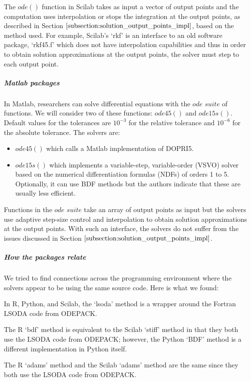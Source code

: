 The $ode()$ function in Scilab takes as input a vector of output points and the computation uses interpolation or stops the integration at the output points, as described in Section $\ref{subsection:solution_output_points_impl}$, based on the method used. For example, Scilab's `rkf' is an interface to an old software package, `rkf45.f' which does not have interpolation capabilities and thus in order to obtain solution
approximations at the output points, the solver must step to each output point.

\subparagraph{Matlab packages}
In Matlab, researchers can solve differential equations with the $ode$ $suite$ \cite{shampine1997matlab} of functions. We will consider two of these functions: $ode45()$ and $ode15s()$.
Default values for the tolerances are $10^{-3}$ for the relative tolerance and $10^{-6}$ for the absolute tolerance. The solvers are:

\begin{itemize}
\item $ode45()$ which calls a Matlab implementation of DOPRI5.

\item $ode15s()$ which implements a variable-step, variable-order (VSVO) solver based on the numerical differentiation formulas (NDFs) \cite{shampine1997matlab} of orders 1 to 5. Optionally, it can use BDF methods but the authors indicate that these are usually less efficient.
\end{itemize}

Functions in the $ode$ $suite$ take an array of output points as input but the solvers use adaptive step-size control and interpolation to obtain solution approximations at the output points. With such an interface, the solvers do not suffer from the issues discussed in Section $\ref{subsection:solution_output_points_impl}$. 

\subparagraph{How the packages relate}
We tried to find connections across the programming environment where the solvers appear to be using the same source code.
Here is what we found:

In R, Python, and Scilab, the `lsoda' method is a wrapper around the Fortran LSODA code from ODEPACK.

The R `bdf' method is equivalent to the Scilab `stiff' method in that they both use the LSODA code from ODEPACK; however, the Python `BDF' method is a different implementation in Python itself.

The R `adams' method and the Scilab `adams' method are the same since they both use the LSODA code from ODEPACK.

